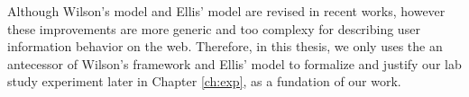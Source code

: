 Although Wilson's model and Ellis' model are revised in recent works, however these improvements
are more generic and too complexy for describing user information behavior on the web.
Therefore, in this thesis, we only uses the an antecessor of Wilson's framework \cite{wilson1997information} and 
Ellis' model \cite{ellis1997modelling} to formalize and justify our lab study experiment later in Chapter \ref{ch:exp}, 
as a fundation of our work.


\cleardoublepage